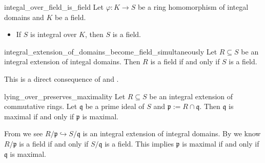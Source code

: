 \begin{proposition}{}{integal_over_field_is_field}
    Let $\varphi:K\to S$ be a ring homomorphism of integal domains and $K$ be a field. 
    \begin{itemize}
        \item If $S$ is integral over $K$, then $S$ is a field.
    \end{itemize}
\end{proposition}

\begin{corollary}{}{integral_extension_of_domains_become_field_simultaneously}
    Let $R\subseteq S$ be an integral extension of integal domains. Then $R$ is a field if and only if $S$ is a field.
\end{corollary}
\begin{prf}
    This is a direct consequence of  and .
\end{prf}

\begin{corollary}{}{lying_over_preserves_maximality}
    Let $R\subseteq S$ be an integral extension of commutative rings. Let $\mathfrak{q}$ be a prime ideal of $S$ and $\mathfrak{p}:=R\cap \mathfrak{q}$. Then  $\mathfrak{q}$ is maximal if and only if $\mathfrak{p}$ is maximal.
\end{corollary}
\begin{prf}
    From  we see $ R/\mathfrak{p}\hookrightarrow S/\mathfrak{q}$ is an integral extension of integral domains. By  we know $R/\mathfrak{p}$ is a field if and only if $S/\mathfrak{q}$ is a field. This implies $\mathfrak{p}$ is maximal if and only if $\mathfrak{q}$ is maximal.
\end{prf}


